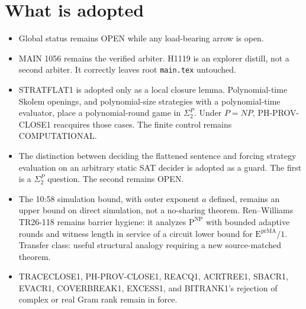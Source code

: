 \documentclass[11pt]{article}
\begin{document}
\section*{What is adopted}
\begin{itemize}
\item Global status remains OPEN while any load-bearing arrow is open.
\item MAIN 1056 remains the verified arbiter. H1119 is an explorer distill, not a second
arbiter. It correctly leaves root \texttt{main.tex} untouched.
\item STRATFLAT1 is adopted only as a local closure lemma. Polynomial-time Skolem openings,
and polynomial-size strategies with a polynomial-time evaluator, place a polynomial-round
game in \(\Sigma_2^P\). Under \(P=NP\), PH-PROV-CLOSE1 reacquires those cases.
The finite control remains COMPUTATIONAL.
\item The distinction between deciding the flattened sentence and forcing strategy evaluation
on an arbitrary static SAT decider is adopted as a guard. The first is a \(\Sigma_2^P\)
question. The second remains OPEN.
\item The 10:58 simulation bound, with outer exponent \(a\) defined, remains an upper bound
on direct simulation, not a no-sharing theorem. Ren--Williams TR26-118 remains barrier
hygiene: it analyzes \(\mathrm{P}^{\mathrm{NP}}\) with bounded adaptive rounds and witness
length in service of a circuit lower bound for \(\mathrm{E}^{\mathrm{prMA}}/1\).
Transfer class: useful structural analogy requiring a new source-matched theorem.
\item TRACECLOSE1, PH-PROV-CLOSE1, REACQ1, ACRTREE1, SBACR1, EVACR1, COVERBREAK1,
EXCESS1, and BITRANK1's rejection of complex or real Gram rank remain in force.
\end{itemize}
\end{document}
